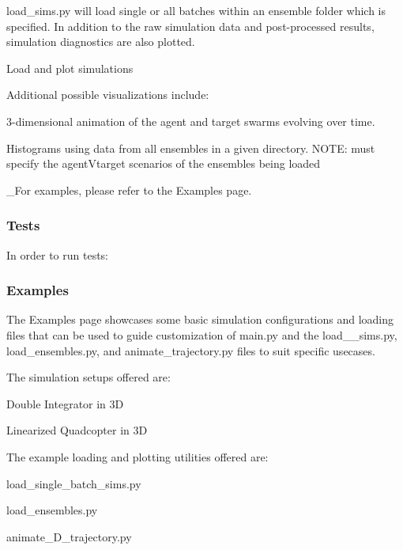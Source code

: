 load\+\_\+sims.\+py will load single or all batches within an ensemble folder which is specified. In addition to the raw simulation data and post-\/processed results, simulation diagnostics are also plotted.

Load and plot simulations 
\begin{DoxyCode}{0}
\end{DoxyCode}


Additional possible visualizations include\+:
\begin{DoxyItemize}
\item 3-\/dimensional animation of the agent and target swarms evolving over time.
\item Histograms using data from all ensembles in a given directory. N\+O\+TE\+: must specify the \textquotesingle{}agent\textquotesingle{}V\textquotesingle{}target\textquotesingle{} scenarios of the ensembles being loaded
\end{DoxyItemize}

\+\_\+\+For examples, please refer to the Examples page.

\subsubsection*{Tests}

In order to run tests\+:


\begin{DoxyCode}{0}
\end{DoxyCode}


\subsubsection*{Examples}

The Examples page showcases some basic simulation configurations and loading files that can be used to guide customization of main.\+py and the load\+\_\+\+\_\+sims.\+py, load\+\_\+ensembles.\+py, and animate\+\_\+trajectory.\+py files to suit specific usecases.

The simulation setups offered are\+:
\begin{DoxyItemize}
\item Double Integrator in 3D
\item Linearized Quadcopter in 3D
\end{DoxyItemize}

The example loading and plotting utilities offered are\+:
\begin{DoxyItemize}
\item load\+\_\+single\+\_\+batch\+\_\+sims.\+py
\item load\+\_\+ensembles.\+py
\item animate\+\_\+D\+\_\+trajectory.\+py
\end{DoxyItemize}

